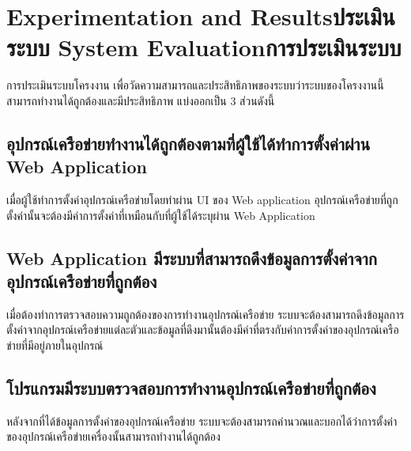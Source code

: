 \chapter{\ifproject%
\ifenglish Experimentation and Results\else ประเมินระบบ\fi
\else%
\ifenglish System Evaluation\else การประเมินระบบ\fi
\fi}

\hspace{0.5in} การประเมินระบบโครงงาน เพื่อวัดความสามารถและประสิทธิภาพของระบบว่าระบบของโครงงานนี้สามารถทำงานได้ถูกต้องและมีประสิทธิภาพ แบ่งออกเป็น 3 ส่วนดังนี้

\section{อุปกรณ์เครือข่ายทำงานได้ถูกต้องตามที่ผู้ใช้ได้ทำการตั้งค่าผ่าน Web Application}
เมื่อผู้ใช้ทำการตั้งค่าอุปกรณ์เครือข่ายโดยทำผ่าน UI ของ Web application อุปกรณ์เครือข่ายที่ถูกตั้งค่านั้นจะต้องมีค่าการตั้งค่าที่เหมือนกับที่ผู้ใช้ได้ระบุผ่าน Web Application 
\section{Web Application มีระบบที่สามารถดึงข้อมูลการตั้งค่าจากอุปกรณ์เครือข่ายที่ถูกต้อง}
เมื่อต้องทำการตรวจสอบความถูกต้องของการทำงานอุปกรณ์เครือข่าย ระบบจะต้องสามารถดึงข้อมูลการตั้งค่าจากอุปกรณ์เครือข่ายแต่ละตัวและข้อมูลที่ดึงมานั้นต้องมีค่าที่ตรงกับค่าการตั้งค่าของอุปกรณ์เครือข่ายที่มีอยู่ภายในอุปกรณ์
\section{โปรแกรมมีระบบตรวจสอบการทำงานอุปกรณ์เครือข่ายที่ถูกต้อง}
หลังจากที่ได้ข้อมูลการตั้งค่าของอุปกรณ์เครือข่าย ระบบจะต้องสามารถคำนวณและบอกได้ว่าการตั้งค่าของอุปกรณ์เครือข่ายเครื่องนั้นสามารถทำงานได้ถูกต้อง
